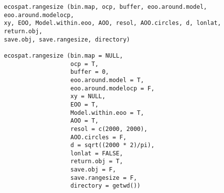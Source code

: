 \documentclass[a4paper]{book}
\begin{document}
%
\begin{Usage}
\begin{verbatim}
ecospat.rangesize (bin.map, ocp, buffer, eoo.around.model, eoo.around.modelocp, 
xy, EOO, Model.within.eoo, AOO, resol, AOO.circles, d, lonlat, return.obj, 
save.obj, save.rangesize, directory)

ecospat.rangesize (bin.map = NULL,
                   ocp = T,
                   buffer = 0,
                   eoo.around.model = T,
                   eoo.around.modelocp = F,
                   xy = NULL,
                   EOO = T,
                   Model.within.eoo = T,
                   AOO = T,
                   resol = c(2000, 2000),
                   AOO.circles = F,
                   d = sqrt((2000 * 2)/pi),
                   lonlat = FALSE,
                   return.obj = T,
                   save.obj = F,
                   save.rangesize = F,
                   directory = getwd())



\end{verbatim}
\end{Usage}
%
\end{document}

